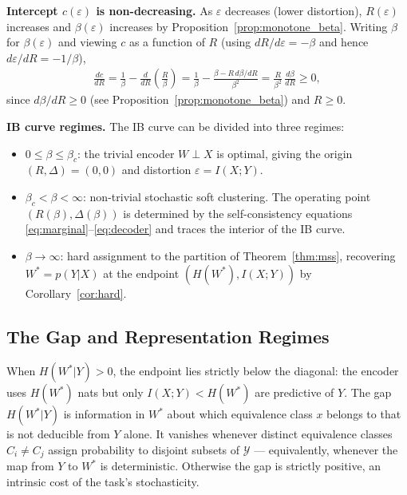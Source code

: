 \documentclass[11pt]{article}
\begin{document}
\medskip
\noindent\textbf{Intercept $c(\varepsilon)$ is non-decreasing.}
As $\varepsilon$ decreases (lower distortion), $R(\varepsilon)$ increases and
$\beta(\varepsilon)$ increases by Proposition~\ref{prop:monotone_beta}.
Writing $\beta$ for $\beta(\varepsilon)$ and viewing $c$ as a function of $R$
(using $dR/d\varepsilon=-\beta$ and hence $d\varepsilon/dR=-1/\beta$),
\begin{align}
    \frac{dc}{dR}
    = \frac{1}{\beta} - \frac{d}{dR}\!\left(\frac{R}{\beta}\right)
    = \frac{1}{\beta} - \frac{\beta - R\,d\beta/dR}{\beta^2}
    = \frac{R}{\beta^2}\,\frac{d\beta}{dR} \geq 0,
    \label{eq:c_nondecreasing}
\end{align}
since $d\beta/dR\geq 0$ (see Proposition~\ref{prop:monotone_beta}) and $R\geq 0$.

\medskip
\noindent\textbf{IB curve regimes.}
The IB curve can be divided into three regimes:
\begin{itemize}
    \item $0\leq\beta\leq\beta_c$: the trivial encoder $W\perp X$ is
    optimal, giving the origin $(R,\Delta)=(0,0)$ and distortion
    $\varepsilon=I(X;Y)$.
    \item $\beta_c<\beta<\infty$: non-trivial stochastic soft
    clustering. The operating point
    $(R(\beta),\Delta(\beta))$ is determined by the
    self-consistency equations
    \eqref{eq:marginal}--\eqref{eq:decoder} and traces the interior
    of the IB curve.
    \item $\beta\to\infty$: hard assignment to the partition of
    Theorem~\ref{thm:mss}, recovering $W^*=p(Y|X)$ at the endpoint
    $(H(W^*),I(X;Y))$ by Corollary~\ref{cor:hard}.
\end{itemize}

\subsection{The Gap and Representation Regimes}

When $H(W^*|Y)>0$, the endpoint lies strictly below the diagonal:
the encoder uses $H(W^*)$ nats but only $I(X;Y)<H(W^*)$ are predictive of $Y$.
The gap $H(W^*|Y)$ is information in $W^*$ about which equivalence
class $x$ belongs to that is not deducible from $Y$ alone.
It vanishes whenever distinct equivalence classes $C_i\neq C_j$
assign probability to disjoint subsets of $\mathcal{Y}$ — equivalently,
whenever the map from $Y$ to $W^*$ is deterministic.
Otherwise the gap is strictly positive, an intrinsic cost of the
task's stochasticity.
\end{document}
